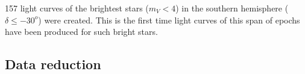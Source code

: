 \documentclass{aa}
\begin{document}
\label{sec:discussion}

157 light curves of the brightest stars ($m_V < 4$) in the southern hemisphere ($\delta \leq -30^o$) were created.
%
This is the first time light curves of this span of epochs have been produced for such bright stars.
%

\subsection{Data reduction}

\label{sec:discdatared}



\end{document}
